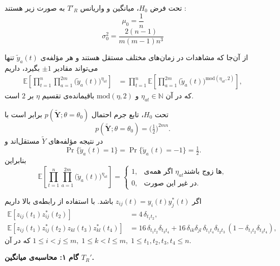 \begin{قضیه}
	تحت فرض
	$H_0$،
	میانگین و واریانس 
	$T'_R$
	به صورت زیر هستند :
	\begin{equation}
		\mu_0=\frac{1}{n} \label{eq:39}
	\end{equation}	
	\begin{equation}
		\sigma_0^2=\frac{2(n-1)}{m(m-1)n^3} \label{eq:40}	
	\end{equation}
\end{قضیه}
\begin{اثبات}
	
	از آن‌جا که مشاهدات در زمان‌های مختلف مستقل هستند و هر مؤلفه‌ی $\tilde y_{a}(t)$ تنها می‌تواند مقادیر $\pm 1$ بگیرد، داریم
	\begin{align}
		\mathbb{E}\!\left[\prod_{t=1}^{n}\prod_{a=1}^{2m}\big(\tilde y_{a}(t)\big)^{\eta_{at}}\right]
		&=\prod_{t=1}^{n}\mathbb{E}\!\left[\prod_{a=1}^{2m}\big(\tilde y_{a}(t)\big)^{\mathrm{mod}(\eta_{at},2)}\right], \label{eq:B1}
	\end{align}
	که در آن $\eta_{at}\in\mathbb{N}$ و $\mathrm{mod}(\eta,2)$ باقیمانده‌ی تقسیم $\eta$ بر $2$ است.  
	
	تحت $H_{0}$، تابع جرم احتمال $p(\tilde{\mathbf{Y}};\theta=\theta_{0})$ برابر است با
	\[
	p(\tilde{\mathbf{Y}};\theta=\theta_{0})
	=\Big(\tfrac{1}{2}\Big)^{2mn}.
	\]
	در نتیجه مؤلفه‌های $\tilde Y$ مستقل‌اند و
	\[
	\Pr\{\tilde y_{a}(t)=1\}=\Pr\{\tilde y_{a}(t)=-1\}=\tfrac{1}{2}.
	\]
	بنابراین
	\[
	\mathbb{E}\!\left[\prod_{t=1}^{n}\prod_{a=1}^{2m}\big(\tilde y_{a}(t)\big)^{\eta_{at}}\right]
	=\begin{cases}
		1, & \text{اگر همه‌ی $\eta_{at}$ها زوج باشند},\\[4pt]
		0, & \text{در غیر این صورت}.
	\end{cases} \tag{87}
	\]
	
	اگر $z_{ij}(t)=y_{i}(t)y_{j}^{*}(t)$ باشد. با استفاده از رابطه‌ی بالا داریم
	\begin{align}
		\mathbb{E}\!\left[z_{ij}(t_{1})z_{ij}^{*}(t_{2})\right]&=4\,\delta_{t_{1}t_{2}}, \label{eq:B2}\\
		\mathbb{E}\!\left[z_{ij}(t_{1})z_{ij}^{*}(t_{2})z_{kl}(t_{3})z_{kl}^{*}(t_{4})\right]
		&=16\,\delta_{t_{1}t_{2}}\delta_{t_{3}t_{4}}
		+16\,\delta_{ik}\delta_{jl}\,\delta_{t_{1}t_{4}}\delta_{t_{2}t_{3}}\,(1-\delta_{t_{1}t_{2}}\delta_{t_{3}t_{4}}), \label{eq:B3}
	\end{align}
	که در آن $1\le i<j\le m,\;1\le k<l\le m,\;1\le t_{1},t_{2},t_{3},t_{4}\le n$.
	
	\medskip
	\noindent\textbf{گام ۱: محاسبه‌ی میانگین $T_{R}'$.}
	

\end{اثبات}
